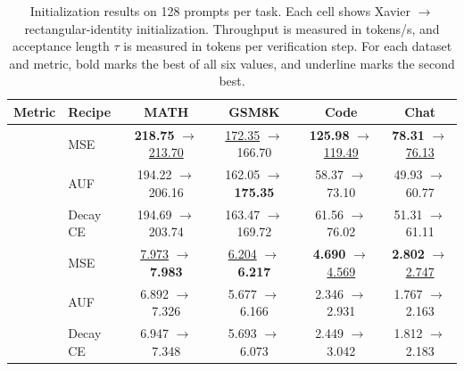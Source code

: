 \begin{table}[ht!]
\centering
\caption{Initialization results on 128 prompts per task. Each cell shows Xavier $\rightarrow$ rectangular-identity initialization. Throughput is measured in tokens/s, and acceptance length $\tau$ is measured in tokens per verification step. For each dataset and metric, bold marks the best of all six values, and underline marks the second best.}
\label{tab:optimization-controls}
\scriptsize
\setlength{\tabcolsep}{2pt}
\begin{tabular}{@{}clcccc@{}}
\toprule
Metric & Recipe & MATH & GSM8K & Code & Chat \\
\midrule
{} & MSE & \textbf{218.75} $\rightarrow$ \underline{213.70} & \underline{172.35} $\rightarrow$ 166.70 & \textbf{125.98} $\rightarrow$ \underline{119.49} & \textbf{78.31} $\rightarrow$ \underline{76.13} \\
& AUF & 194.22 $\rightarrow$ 206.16 & 162.05 $\rightarrow$ \textbf{175.35} & 58.37 $\rightarrow$ 73.10 & 49.93 $\rightarrow$ 60.77 \\
& Decay CE & 194.69 $\rightarrow$ 203.74 & 163.47 $\rightarrow$ 169.72 & 61.56 $\rightarrow$ 76.02 & 51.31 $\rightarrow$ 61.11 \\
\midrule
{} & MSE & \underline{7.973} $\rightarrow$ \textbf{7.983} & \underline{6.204} $\rightarrow$ \textbf{6.217} & \textbf{4.690} $\rightarrow$ \underline{4.569} & \textbf{2.802} $\rightarrow$ \underline{2.747} \\
& AUF & 6.892 $\rightarrow$ 7.326 & 5.677 $\rightarrow$ 6.166 & 2.346 $\rightarrow$ 2.931 & 1.767 $\rightarrow$ 2.163 \\
& Decay CE & 6.947 $\rightarrow$ 7.348 & 5.693 $\rightarrow$ 6.073 & 2.449 $\rightarrow$ 3.042 & 1.812 $\rightarrow$ 2.183 \\
\bottomrule
\end{tabular}
\end{table}
